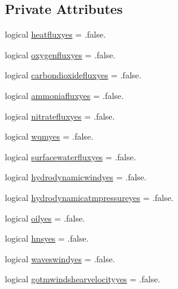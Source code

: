\subsection*{Private Attributes}
\begin{DoxyCompactItemize}
\item 
logical \mbox{\hyperlink{structmoduleinterfacewaterair_1_1t__ext__options_a93c8ec515bc69efb027d9971e61698e8}{heatfluxyes}} = .false.
\item 
logical \mbox{\hyperlink{structmoduleinterfacewaterair_1_1t__ext__options_aacc56bca5c24c9154dc4113a3b9d5b3e}{oxygenfluxyes}} = .false.
\item 
logical \mbox{\hyperlink{structmoduleinterfacewaterair_1_1t__ext__options_a907fc8c5da35c963b6255d62e1fb740e}{carbondioxidefluxyes}} = .false.
\item 
logical \mbox{\hyperlink{structmoduleinterfacewaterair_1_1t__ext__options_a0fbe9a796f0480207430154586a55424}{ammoniafluxyes}} = .false.
\item 
logical \mbox{\hyperlink{structmoduleinterfacewaterair_1_1t__ext__options_a84f70d1ed3ca66ab73d8dfeb742ebb87}{nitratefluxyes}} = .false.
\item 
logical \mbox{\hyperlink{structmoduleinterfacewaterair_1_1t__ext__options_abd839d563e1f2b3d25ef74fef931314b}{wqmyes}} = .false.
\item 
logical \mbox{\hyperlink{structmoduleinterfacewaterair_1_1t__ext__options_a681b49432ab5cf898dd949443c6054ce}{surfacewaterfluxyes}} = .false.
\item 
logical \mbox{\hyperlink{structmoduleinterfacewaterair_1_1t__ext__options_ab5ad4ecfb36d02da3f0f8d391e88fd00}{hydrodynamicwindyes}} = .false.
\item 
logical \mbox{\hyperlink{structmoduleinterfacewaterair_1_1t__ext__options_aed26dc279230e5166586a5e485bfa055}{hydrodynamicatmpressureyes}} = .false.
\item 
logical \mbox{\hyperlink{structmoduleinterfacewaterair_1_1t__ext__options_a67c300102e598f5b31e12df9aa42e7ae}{oilyes}} = .false.
\item 
logical \mbox{\hyperlink{structmoduleinterfacewaterair_1_1t__ext__options_a8c3039ed0607fa25781362225bf186b3}{hnsyes}} = .false.
\item 
logical \mbox{\hyperlink{structmoduleinterfacewaterair_1_1t__ext__options_a4d6427f9a04b011d7d76281e4e2dd1d6}{waveswindyes}} = .false.
\item 
logical \mbox{\hyperlink{structmoduleinterfacewaterair_1_1t__ext__options_ad85a7e39ac9d27e0e4a47ea68dc9a3cd}{gotmwindshearvelocityyes}} = .false.

\end{DoxyCompactItemize}
